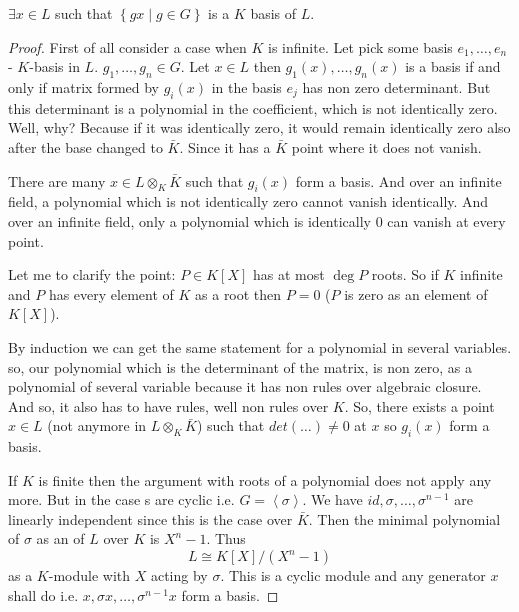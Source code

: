 \begin{theorem}
  $\exists x \in L$ such that
  $\left\{gx \mid g \in G\right\}$ is a $K$ basis of $L$.
  \begin{proof}
    First of all consider a case when $K$ is infinite. Let pick some
    basis $e_1, \dots, e_n$ - $K$-basis in $L$. $g_1, \dots, g_n \in
    G$. Let $x \in L$ then $g_1\left(x\right), \dots,
    g_n\left(x\right)$ is a basis if and only if matrix formed by
    $g_i\left(x\right)$ in the basis $e_j$ has non zero
    determinant. But this determinant is a polynomial in the
    coefficient, which is not identically zero. Well, why? Because if
    it was identically zero, it would remain identically zero also
    after the base changed to $\bar{K}$. Since it has a $\bar{K}$
    point where it does not vanish.

    There are many $x \in L \otimes_K \bar{K}$ such that
    $g_i\left(x\right)$ form a basis. And over an infinite field, a
    polynomial which is not identically zero cannot vanish
    identically. And over an infinite field, only a polynomial which
    is identically 0 can vanish at every point.

    Let me to clarify the point: $P \in K\left[X\right]$ has at most
    $\deg P$ roots. So if $K$ infinite and $P$ has every element of
    $K$ as a root then $P = 0$ ($P$ is zero as an element of
    $K\left[X\right]$).

    By induction we can get the same statement for a polynomial in
    several variables. so, our polynomial which is the determinant of the matrix, 
    is non zero, as a polynomial of several variable because it 
    has non rules over algebraic closure. 
    And so, it also has to have rules, well non rules over $K$. So, there
    exists a point $x \in L$ (not anymore in $L \otimes_K \bar{K}$)
    such that $det(\dots) \ne 0$ at $x$ so $g_i\left(x\right)$ form a
    basis.

    If $K$ is finite then the argument with roots of a polynomial does
    not apply any more. But in the case s are
    cyclic i.e. $G = \left<\sigma\right>$. We have $id, \sigma, \dots,
    \sigma^{n-1}$ are linearly independent since this is the case over
    $\bar{K}$. Then the minimal polynomial of $\sigma$ as an
     of $L$ over $K$ is $X^n - 1$. Thus
    \[
    L \cong K\left[X\right]/\left(X^n - 1\right)
    \]
    as a $K$-module with $X$ acting by $\sigma$. This is a cyclic
    module and any generator $x$ shall do i.e. $x, \sigma x, \dots,
    \sigma^{n-1} x$ form a basis.
  \end{proof}
  \label{thm:normalbase}
\end{theorem}

